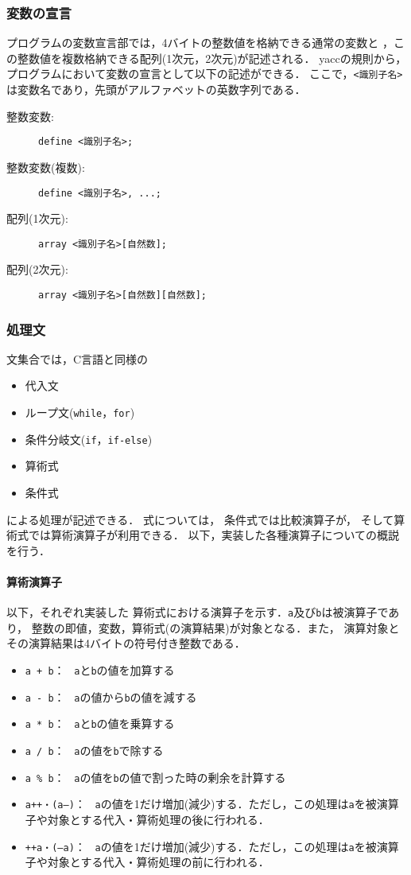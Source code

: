 \subsubsection{変数の宣言}
プログラムの変数宣言部では，4バイトの整数値を格納できる通常の変数と
，この整数値を複数格納できる配列(1次元，2次元)が記述される．
yaccの規則から，プログラムにおいて変数の宣言として以下の記述ができる．
ここで，\verb|<識別子名>|は変数名であり，先頭がアルファベットの英数字列である．
\begin{description}
  \item[整数変数:] \verb|define <識別子名>;|
  \item[整数変数(複数):] \verb|define <識別子名>, ...;|
  \item[配列(1次元):] \verb|array <識別子名>[自然数];|
  \item[配列(2次元):] \verb|array <識別子名>[自然数][自然数];|
\end{description}

\subsubsection{処理文}
文集合では，C言語と同様の
\begin{itemize}
  \item 代入文
  \item ループ文(\verb|while|，\verb|for|)
  \item 条件分岐文(\verb|if|，\verb|if-else|)
  \item 算術式
  \item 条件式
\end{itemize}
による処理が記述できる．
式については，
条件式では比較演算子が，
そして算術式では算術演算子が利用できる．
以下，実装した各種演算子についての概説を行う．

\paragraph*{算術演算子}
以下，それぞれ実装した
算術式における演算子を示す．\verb|a|及び\verb|b|は被演算子であり，
整数の即値，変数，算術式(の演算結果)が対象となる．また，
演算対象とその演算結果は4バイトの符号付き整数である．
\begin{itemize}
  \item \texttt{a + b}： \ \verb|a|と\verb|b|の値を加算する
  \item \texttt{a - b}： \ \verb|a|の値から\verb|b|の値を減する
  \item \texttt{a * b}： \ \verb|a|と\verb|b|の値を乗算する
  \item \texttt{a / b}： \ \verb|a|の値を\verb|b|で除する
  \item \texttt{a \% b}： \ \verb|a|の値を\verb|b|の値で割った時の剰余を計算する  
  \item \texttt{a++・(a--)}： \ \verb|a|の値を1だけ増加(減少)する．ただし，この処理は\verb|a|を被演算子や対象とする代入・算術処理の後に行われる．     
  \item \texttt{++a・(--a)}： \ \verb|a|の値を1だけ増加(減少)する．ただし，この処理は\verb|a|を被演算子や対象とする代入・算術処理の前に行われる．     
\end{itemize}


